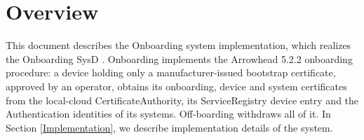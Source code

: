 \documentclass[a4paper]{arrowhead}
\begin{document}
\sloppy

\ArrowheadSetup

\begin{center}
  \vspace*{1cm}
  \huge{\arrowtitle}

  \vspace*{0.2cm}
  \LARGE{\arrowtype}
  \vspace*{1cm}

  \vspace*{\fill}


  \vspace*{1cm}
  \vspace*{\fill}

  \begin{abstract}
    This document describes the design and implementation of the Onboarding support system of Arrowhead 5.2.2 (\texttt{ah5-Onboarding-java-spring}).
  \end{abstract}

  \vspace*{1cm}
\end{center}

\newpage

\tableofcontents
\newpage

\section{Overview}
\label{sec:overview}

This document describes the Onboarding system implementation, which realizes the Onboarding SysD \cite{onb-sysd}. Onboarding implements the Arrowhead 5.2.2 onboarding procedure: a device holding only a manufacturer-issued bootstrap certificate, approved by an operator, obtains its onboarding, device and system certificates from the local-cloud Certificate\allowbreak{}Authority, its ServiceRegistry device entry and the Authentication identities of its systems. Off-boarding withdraws all of it.
In Section \ref{Implementation}, we describe implementation details of the system.
\end{document}
